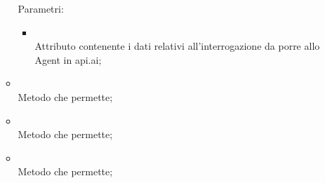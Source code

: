 \begin{itemize}
\begin{itemize}
		Parametri:
		\begin{itemize}
			\item {} \\
			Attributo contenente i dati relativi all'interrogazione da porre allo Agent in api.ai;
		\end{itemize}
		\item[]  \\
		Metodo che permette;\\
		\item[]  \\
		Metodo che permette;\\
		\item[]  \\
		Metodo che permette;\\
	\end{itemize}
\end{itemize}
\FloatBarrier

